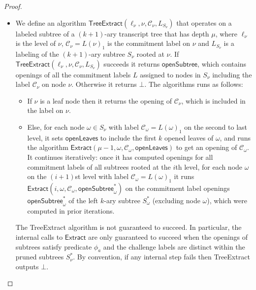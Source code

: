 \begin{proof}
\begin{itemize}
\item We define an algorithm $\textsf{TreeExtract}(\ell_\nu, \nu, \mathcal{C}_\nu, L_{S_\nu})$ that operates on a labeled subtree of a $(k+1)$-ary transcript tree that has depth $\mu$,  where $\ell_\nu$ is the level of $\nu$, $\mathcal{C}_\nu = L(\nu)_1$ is the commitment label on $\nu$ and $L_{S_\nu}$ is a labeling of the $(k+1)$-ary subtree $S_\nu$ rooted at $\nu$. If $\textsf{TreeExtract}(\ell_\nu, \nu, \mathcal{C}_\nu, L_{S_\nu})$ succeeds it returns $\textsf{openSubtree}$, which contains openings of all the commitment labels $L$ assigned to nodes in $S_\nu$ including the label $\mathcal{C}_\nu$ on node $\nu$. Otherwise it returns $\bot$. The algorithms runs as follows: 
\begin{itemize}  
\item If $\nu$ is a leaf node then it returns the opening of $\mathcal{C}_\nu$, which is included in the label on $\nu$. \
\item Else, for each node $\omega \in S_{\nu}$ with label $\mathcal{C}_\omega = L(\omega)_1$ on the second to last level, it sets $\textsf{openLeaves}$ to include the first $k$ opened leaves of $\omega$, and runs the algorithm $\textsf{Extract}(\mu - 1, \omega, \mathcal{C}_\omega, \textsf{openLeaves})$ to get an opening of $\mathcal{C}_\omega$. It continues iteratively: once it has computed openings for all commitment labels of all subtrees rooted at the $i$th level, for each node $\omega$ on the $(i+1)$st level with label $\mathcal{C}_\omega = L(\omega)_1$ it runs $\textsf{Extract}(i, \omega, \mathcal{C}_\omega, \textsf{openSubtree}^*_\omega)$ on the commitment label openings $\textsf{openSubtree}^*_\omega$ of the left $k$-ary subtree $S^*_\omega$ (excluding node $\omega$), which were computed in prior iterations. 
\end{itemize}

The \textsf{TreeExtract} algorithm is not guaranteed to succeed. In particular, the internal calls to $\textsf{Extract}$ are only guaranteed to succeed when the openings of subtrees satisfy predicate $\phi_a$ and the challenge labels are distinct within the pruned subtrees $S^*_\nu$. By convention, if any internal step fails then \textsf{TreeExtract} outputs $\bot$. 


\end{itemize}
\end{proof}
